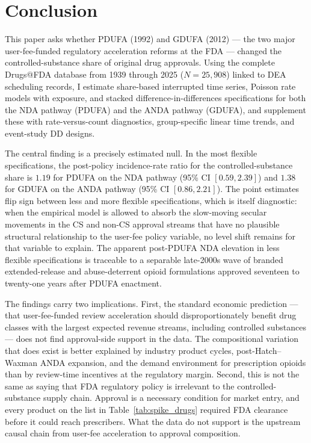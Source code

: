 \section{Conclusion}
\label{sec:conclusion}

This paper asks whether PDUFA (1992) and GDUFA (2012) --- the two major user-fee-funded regulatory acceleration reforms at the FDA --- changed the controlled-substance share of original drug approvals. Using the complete Drugs@FDA database from 1939 through 2025 ($N = 25{,}908$) linked to DEA scheduling records, I estimate share-based interrupted time series, Poisson rate models with exposure, and stacked difference-in-differences specifications for both the NDA pathway (PDUFA) and the ANDA pathway (GDUFA), and supplement these with rate-versus-count diagnostics, group-specific linear time trends, and event-study DD designs.

The central finding is a precisely estimated null. In the most flexible specifications, the post-policy incidence-rate ratio for the controlled-substance share is $1.19$ for PDUFA on the NDA pathway (95\% CI $[0.59, 2.39]$) and $1.38$ for GDUFA on the ANDA pathway (95\% CI $[0.86, 2.21]$). The point estimates flip sign between less and more flexible specifications, which is itself diagnostic: when the empirical model is allowed to absorb the slow-moving secular movements in the CS and non-CS approval streams that have no plausible structural relationship to the user-fee policy variable, no level shift remains for that variable to explain. The apparent post-PDUFA NDA elevation in less flexible specifications is traceable to a separable late-2000s wave of branded extended-release and abuse-deterrent opioid formulations approved seventeen to twenty-one years after PDUFA enactment.

The findings carry two implications. First, the standard economic prediction --- that user-fee-funded review acceleration should disproportionately benefit drug classes with the largest expected revenue streams, including controlled substances --- does not find approval-side support in the data. The compositional variation that does exist is better explained by industry product cycles, post-Hatch--Waxman ANDA expansion, and the demand environment for prescription opioids than by review-time incentives at the regulatory margin. Second, this is not the same as saying that FDA regulatory policy is irrelevant to the controlled-substance supply chain. Approval is a necessary condition for market entry, and every product on the list in Table~\ref{tab:spike_drugs} required FDA clearance before it could reach prescribers. What the data do not support is the upstream causal chain from user-fee acceleration to approval composition.

